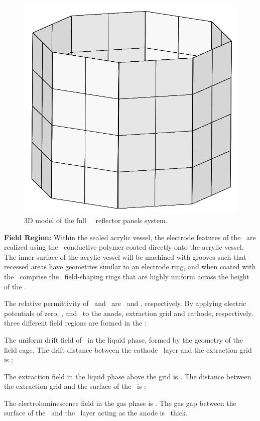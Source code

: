 \begin{figure}[t!]
\centering
\includegraphics[width=\columnwidth]{./Figures/TPC-reflector_panel.png}
\caption[3D model of the full \DSks\ \LArTPC\ reflector panels system]{3D model of the full \DSks\ \LArTPC\ reflector panels system.}
\label{fig:re_panel}
\end{figure}

{\bf Field Region:} Within the sealed acrylic vessel, the electrode features of the \TPC\ are realized using the \Clevios\ conductive polymer coated directly onto the acrylic vessel. The inner surface of the acrylic vessel will be machined with grooves such that recessed areas have geometries similar to an electrode ring, and when coated with the \Clevios\ comprise the \TPC\ field-shaping rings that are highly uniform across the height of the \TPC.  

The relative permittivity of \LAr\ and \GAr\ are \LArRelativePermittivity\ and \GArRelativePermittivity, respectively.  By applying electric potentials of zero, \DSkGridPotential, and \DSkCathodePotential\ to the anode, extraction grid and cathode, respectively, three different field regions are formed in the \TPC:

\begin{compactitem}
\item The uniform drift field of \DSkDriftField\ in the liquid phase, formed by the geometry of the field cage. The drift distance between the cathode \Clevios\ layer and the extraction grid is \DSkTPCHeight;
\item The extraction field in the liquid phase above the grid is \DSkExtractionField. The distance between the extraction grid and the surface of the \LAr\ is \DSkLArOverGridThickness;
\item The electroluminescence field in the gas phase is \DSkElectroLuminescenceField. The gas gap between the surface of the \LAr\ and the \Clevios\ layer acting as the anode is \DSkGasPocketThickness\ thick.
\end{compactitem}

